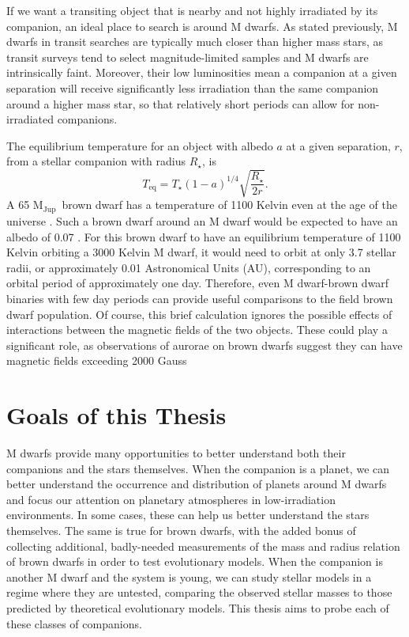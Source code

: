 \documentclass[12pt]{caltech_thesis}
\newcommand{\rstar}{{$R_\star$}}
\newcommand{\mjup}{{M$_\textrm{Jup}$}}
\begin{document}
If we want a transiting object that is nearby and not highly irradiated by its companion,
an ideal place to search is around M dwarfs. 
As stated previously, M dwarfs in transit searches are typically much closer than 
higher mass stars, as transit surveys tend to select magnitude-limited samples and
M dwarfs are intrinsically faint. 
Moreover, their low luminosities mean a companion at a given separation will receive
significantly less irradiation than the same companion around a higher mass star,
so that relatively short periods can allow for non-irradiated companions.

The equilibrium temperature for an object with albedo $a$ at a given separation, $r$, from a 
stellar companion with radius \rstar, is
\begin{equation}
T_{\textrm{eq}} = T_\star (1-a)^{1/4} \sqrt{\frac{R_\star}{2r}}.
\end{equation}
A 65 \mjup\ brown dwarf has a temperature of 1100 Kelvin even at the age of 
the universe \citep{Saumon08}. 
Such a brown dwarf around an M dwarf would be expected to have an albedo of
0.07 \citep{Marley99}.
For this brown dwarf to have an equilibrium temperature of 1100 Kelvin orbiting a
3000 Kelvin M dwarf, it would need to orbit at only 3.7 stellar radii, or approximately
0.01 Astronomical Units (AU), corresponding to an orbital period of approximately one day.
Therefore, even M dwarf-brown dwarf binaries with few day periods can provide useful 
comparisons to the field brown dwarf population.
Of course, this brief calculation ignores the possible effects of interactions between
the magnetic fields of the two objects. These could play a significant role, as 
observations of aurorae on brown dwarfs suggest they can have magnetic fields exceeding
2000 Gauss \citep{Hallinan15}





\section{Goals of this Thesis} 

M dwarfs provide many opportunities to better understand both their companions and
the stars themselves. 
When the companion is a planet, we can better understand the occurrence and distribution
of planets around M dwarfs and focus our attention on planetary atmospheres in
low-irradiation environments. 
In some cases, these can help us better understand the stars themselves.
The same is true for brown dwarfs, with the added bonus of collecting additional, 
badly-needed measurements of the mass and radius relation of brown dwarfs in order
to test evolutionary models.
When the companion is another M dwarf and the system is young, we can study stellar models
in a regime where they are untested, comparing the observed stellar masses to those
predicted by theoretical evolutionary models.
This thesis aims to probe each of these classes of companions.
\end{document}
